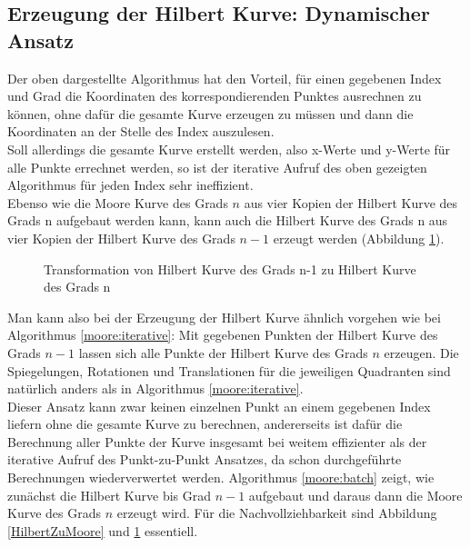 \documentclass[course=erap]{aspdoc}
\begin{document}
\subsection{Erzeugung der Hilbert Kurve: Dynamischer Ansatz}
Der oben dargestellte Algorithmus hat den Vorteil, für einen gegebenen Index und Grad die Koordinaten des korrespondierenden Punktes ausrechnen zu können, ohne dafür die gesamte Kurve erzeugen zu müssen und dann die Koordinaten an der Stelle des Index auszulesen.\\ 
Soll allerdings die gesamte Kurve erstellt werden, also x-Werte und y-Werte für alle Punkte errechnet werden, so ist der iterative Aufruf des oben gezeigten Algorithmus für jeden Index sehr ineffizient.\\
Ebenso wie die Moore Kurve des Grads $n$ aus vier Kopien der Hilbert Kurve des Grads n aufgebaut werden kann, kann auch die Hilbert Kurve des Grads n aus vier Kopien der Hilbert Kurve des Grads $n-1$ erzeugt werden (Abbildung \ref{HilbertZuHilbert}).
\begin{figure}[h]
\centering
\def\svgwidth{240pt}

\caption{Transformation von Hilbert Kurve des Grads n-1 zu Hilbert Kurve des Grads n}
\label{HilbertZuHilbert}
\end{figure}
Man kann also bei der Erzeugung der Hilbert Kurve ähnlich vorgehen wie bei Algorithmus \ref{moore:iterative}: Mit gegebenen Punkten der Hilbert Kurve des Grads $n-1$ lassen sich alle Punkte der Hilbert Kurve des Grads $n$ erzeugen. 
Die Spiegelungen, Rotationen und Translationen für die jeweiligen Quadranten sind natürlich anders als in Algorithmus \ref{moore:iterative}. \\
Dieser Ansatz kann zwar keinen einzelnen Punkt an einem gegebenen Index liefern ohne die gesamte Kurve zu berechnen, andererseits ist dafür die Berechnung aller Punkte der Kurve insgesamt bei weitem effizienter als der iterative Aufruf des Punkt-zu-Punkt Ansatzes, da schon durchgeführte Berechnungen wiederverwertet werden. Algorithmus \ref{moore:batch} zeigt, wie zunächst die Hilbert Kurve bis Grad $n-1$ aufgebaut und daraus dann die Moore Kurve des Grads $n$ erzeugt wird. Für die Nachvollziehbarkeit sind Abbildung \ref{HilbertZuMoore} und \ref{HilbertZuHilbert} essentiell.
\end{document}
